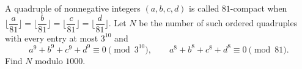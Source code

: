 A quadruple of nonnegative integers $(a,b,c,d)$ is called $81$-compact when $\lfloor\dfrac{a}{81}\rfloor=\lfloor\dfrac{b}{81}\rfloor=\lfloor\dfrac{c}{81}\rfloor=\lfloor\dfrac{d}{81}\rfloor$. Let $N$ be the number of such ordered quadruples with every entry at most $3^{10}$ and
\[
a^9+b^9+c^9+d^9\equiv0\pmod{3^{10}},\qquad
a^8+b^8+c^8+d^8\equiv0\pmod{81}.
\]
Find $N$ modulo $1000$.
